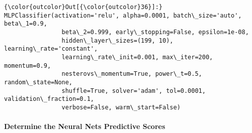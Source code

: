 \documentclass[11pt]{article}
\begin{document}
\begin{Verbatim}[commandchars=\\\{\}]
{\color{outcolor}Out[{\color{outcolor}36}]:} MLPClassifier(activation='relu', alpha=0.0001, batch\_size='auto', beta\_1=0.9,
                beta\_2=0.999, early\_stopping=False, epsilon=1e-08,
                hidden\_layer\_sizes=(199, 10), learning\_rate='constant',
                learning\_rate\_init=0.001, max\_iter=200, momentum=0.9,
                nesterovs\_momentum=True, power\_t=0.5, random\_state=None,
                shuffle=True, solver='adam', tol=0.0001, validation\_fraction=0.1,
                verbose=False, warm\_start=False)
\end{Verbatim}
            
    \paragraph{Determine the Neural Nets Predictive
Scores}\label{determine-the-neural-nets-predictive-scores}
\end{document}

